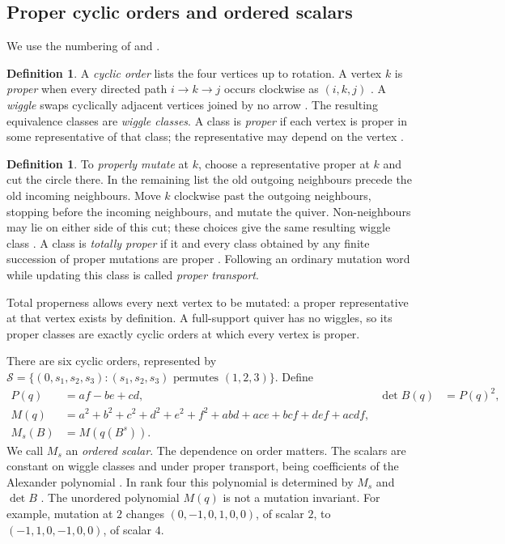 \documentclass[11pt]{amsart}
\theoremstyle{definition}\newtheorem{definition}[theorem]{Definition}
\theoremstyle{remark}\newtheorem{remark}[theorem]{Remark}
\newcommand{\Ssix}{\mathcal S}\newcommand{\mut}[1]{\mu_{[#1]}}
\begin{document}
\subsection{Proper cyclic orders and ordered scalars}\label{sec:proper}
We use the numbering of \cite[arXiv v3]{FN} and \cite[arXiv v2]{Neville}.
\begin{definition}\label{def:proper}
A \emph{cyclic order} lists the four vertices up to rotation. A vertex $k$ is \emph{proper} when every directed path $i\to k\to j$ occurs clockwise as $(i,k,j)$ \cite[Definition~5.2]{FN}. A \emph{wiggle} swaps cyclically adjacent vertices joined by no arrow \cite[Definition~2.3]{FN}. The resulting equivalence classes are \emph{wiggle classes}. A class is \emph{proper} if each vertex is proper in some representative of that class; the representative may depend on the vertex \cite[Definitions~5.4, 11.1]{FN}.
\end{definition}
\begin{definition}\label{def:transport}
To \emph{properly mutate} at $k$, choose a representative proper at $k$ and cut the circle there. In the remaining list the old outgoing neighbours precede the old incoming neighbours. Move $k$ clockwise past the outgoing neighbours, stopping before the incoming neighbours, and mutate the quiver. Non-neighbours may lie on either side of this cut; these choices give the same resulting wiggle class \cite[Definition~6.1]{FN}. A class is \emph{totally proper} if it and every class obtained by any finite succession of proper mutations are proper \cite[Definition~14.1]{FN}. Following an ordinary mutation word while updating this class is called \emph{proper transport}.
\end{definition}
Total properness allows every next vertex to be mutated: a proper representative at that vertex exists by definition. A full-support quiver has no wiggles, so its proper classes are exactly cyclic orders at which every vertex is proper.

There are six cyclic orders, represented by
$\Ssix=\{(0,s_1,s_2,s_3):(s_1,s_2,s_3)\text{ permutes }(1,2,3)\}$.
Define
\begin{align}
 P(q)&=af-be+cd, &\det B(q)&=P(q)^2,\label{eq:pf}\\
 M(q)&=a^2+b^2+c^2+d^2+e^2+f^2+abd+ace+bcf+def+acdf,\label{eq:scalar}\\
 M_s(B)&=M(q(B^s)).\nonumber
\end{align}
We call $M_s$ an \emph{ordered scalar}. The dependence on order matters. The scalars are constant on wiggle classes and under proper transport, being coefficients of the Alexander polynomial \cite[(9.6)--(9.7), Corollary~14.2]{FN}. In rank four this polynomial is determined by $M_s$ and $\det B$ \cite[Remark~9.4]{FN}. The unordered polynomial $M(q)$ is not a mutation invariant. For example, mutation at $2$ changes $(0,-1,0,1,0,0)$, of scalar $2$, to $(-1,1,0,-1,0,0)$, of scalar $4$.
\end{document}
